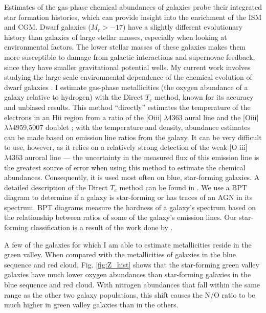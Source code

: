Estimates of the gas-phase chemical abundances of galaxies probe their 
integrated star formation histories, which can provide insight into the 
enrichment of the ISM and CGM.  Dwarf galaxies ($M_r > -17$) have a 
slightly different evolutionary history than galaxies of large stellar masses, 
especially when looking at environmental factors.  The lower stellar masses of 
these galaxies makes them more susceptible to damage from galactic interactions 
and supernovae feedback, since they have smaller gravitational potential wells.  
My current work involves studying the large-scale environmental dependence of 
the chemical evolution of dwarf galaxies \citep{Douglass17a,Douglass17b}.  I estimate gas-phase 
metallicities (the oxygen abundance of a galaxy relative to hydrogen) with the 
Direct $T_e$ method, known for its accuracy and unbiased results.  This method 
``directly'' estimates the temperature of the electrons in an H{\sc ii} 
region from a ratio of the [O{\sc iii}] $\lambda$4363 aural line and the 
[O{\sc iii}] $\lambda \lambda$4959,5007 doublet \citep[as discussed in][this ratio 
is sensitive to the temperature of the ionized gas in an H{\sc ii} 
region]{Osterbrock89,Douglass17a}; with the temperature and density, abundance estimates can 
be made based on emission line ratios from the galaxy.  It can be very difficult 
to use, however, as it relies on a relatively strong detection of the weak [O 
{\sc iii}] $\lambda 4363$ auroral line --- the uncertainty in the measured flux 
of this emission line is the greatest source of error when using this method to 
estimate the chemical abundances.  Consequently, it is used most often on blue, 
star-forming galaxies.  A detailed description of the Direct $T_e$ method can be 
found in \cite{Douglass17a}.  We use a BPT diagram \citep{Baldwin81} to determine if a 
galaxy is star-forming or has traces of an AGN in its spectrum.  BPT diagrams 
measure the hardness of a galaxy's spectrum based on the relationship between 
ratios of some of the galaxy's emission lines.  Our star-forming classification 
is a result of the work done by \cite{Brinchmann04}.

A few of the galaxies for which I am able to estimate metallicities reside in 
the green valley.  When compared with the metallicities of galaxies in the blue 
sequence and red cloud, Fig. \ref{fig:Z_hist} shows that the star-forming green 
valley galaxies have much lower oxygen abundances than star-forming galaxies in 
the blue sequence and red cloud.  With nitrogen abundances that fall within the 
same range as the other two galaxy populations, this shift causes the N/O ratio 
to be much higher in green valley galaxies than in the others.

